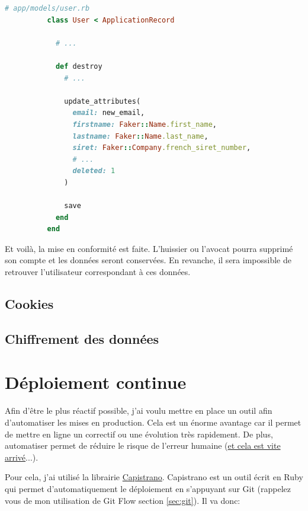 \documentclass[]{report}
\begin{document}
        \begin{scriptsize}
          \begin{lstlisting}[language=ruby]
          # app/models/user.rb
          class User < ApplicationRecord

            # ...

            def destroy
              # ...

              update_attributes(
                email: new_email,
                firstname: Faker::Name.first_name,
                lastname: Faker::Name.last_name,
                siret: Faker::Company.french_siret_number,
                # ...
                deleted: 1
              )

              save
            end
          end
          \end{lstlisting}
        \end{scriptsize}

        Et voilà, la mise en conformité est faite. L'huissier ou l'avocat pourra supprimé son compte et les données seront conservées. En revanche, il sera impossible de retrouver l'utilisateur correspondant à ces données.

    \subsection{Cookies}


    \subsection{Chiffrement des données}


  \section{Déploiement continue}\label{sec:deployments}

    Afin d'être le plus réactif possible, j'ai voulu mettre en place un outil afin d'automatiser les mises en production. Cela est un énorme avantage car il permet de mettre en ligne un correctif ou une évolution très rapidement. De plus, automatiser permet de réduire le risque de l'erreur humaine (\href{https://www.reddit.com/r/webdev/comments/5rd79m/gitlab_employee_just_ran_rm_rf_on_their/}{et cela est vite arrivé}...).

    Pour cela, j'ai utilisé la librairie \href{https://capistranorb.com}{Capistrano}. Capistrano est un outil écrit en Ruby qui permet d'automatiquement le déploiement en s'appuyant sur Git (rappelez vous de mon utilisation de Git Flow section \ref{sec:git}). Il va donc:
\end{document}
